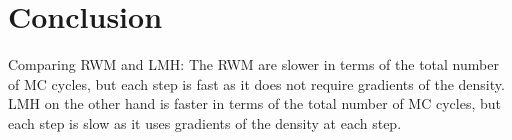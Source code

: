 \section{Conclusion}\label{sec:Conclusion}

Comparing RWM and LMH: The RWM are slower in terms of the total number of MC cycles, but each step is fast as it does not require gradients of the density. LMH on the other hand is faster in terms of the total number of MC cycles, but each step is slow as it uses gradients of the density at each step. 